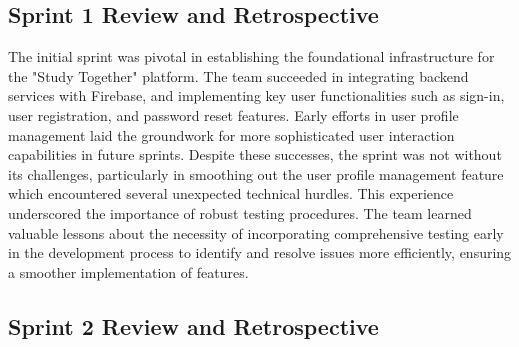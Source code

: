 

\subsection{Sprint 1 Review and Retrospective}\label{sprint1_review_retrospective}
The initial sprint was pivotal in establishing the foundational infrastructure for the "Study Together" platform. The team succeeded in integrating backend services with Firebase, and implementing key user functionalities such as sign-in, user registration, and password reset features. Early efforts in user profile management laid the groundwork for more sophisticated user interaction capabilities in future sprints. Despite these successes, the sprint was not without its challenges, particularly in smoothing out the user profile management feature which encountered several unexpected technical hurdles. This experience underscored the importance of robust testing procedures. The team learned valuable lessons about the necessity of incorporating comprehensive testing early in the development process to identify and resolve issues more efficiently, ensuring a smoother implementation of features.


\subsection{Sprint 2 Review and Retrospective}\label{sprint2_review_retrospective}

